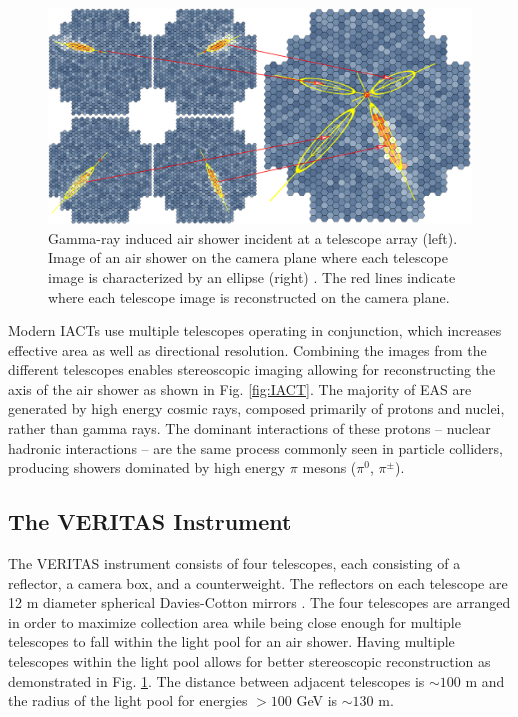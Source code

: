 \documentclass[main.tex]{subfiles}
\begin{document}
\begin{figure}[htbp]
  \centering
  \includegraphics[width=0.96\linewidth]{images/Stereo}
  \caption[Gamma-ray EAS at a telescope array.]{Gamma-ray induced air shower incident at a telescope array (left). Image of an air shower on the camera plane where each telescope image is characterized by an ellipse (right) \cite{hess_web}. The red lines indicate where each telescope image is reconstructed on the camera plane.}
  \label{fig:camera_face}
\end{figure}

Modern IACTs use multiple telescopes operating in conjunction, which increases effective area as well as directional resolution. Combining the images from the different telescopes enables stereoscopic imaging allowing for reconstructing the axis of the air shower as shown in Fig. \ref{fig:IACT}. The majority of EAS are generated by high energy cosmic rays, composed primarily of protons and nuclei, rather than gamma rays. The dominant interactions of these protons -- nuclear hadronic interactions -- are the same process commonly seen in particle colliders, producing showers dominated by high energy $\pi$ mesons ($\pi^0$, $\pi^\pm$).
\subsection{The VERITAS Instrument}
The VERITAS instrument consists of four telescopes, each consisting of a reflector, a camera box, and a counterweight. The reflectors on each telescope are 12 m diameter spherical Davies-Cotton mirrors \cite{DaviesCotton}. The four telescopes are arranged in order to maximize collection area while being close enough for multiple telescopes to fall within the light pool for an air shower. Having multiple telescopes within the light pool allows for better stereoscopic reconstruction as demonstrated in Fig. \ref{fig:camera_face}. The distance between adjacent telescopes is $\sim 100$ m and the radius of the light pool for energies $>100$ GeV is $\sim 130$ m.\par
\end{document}
